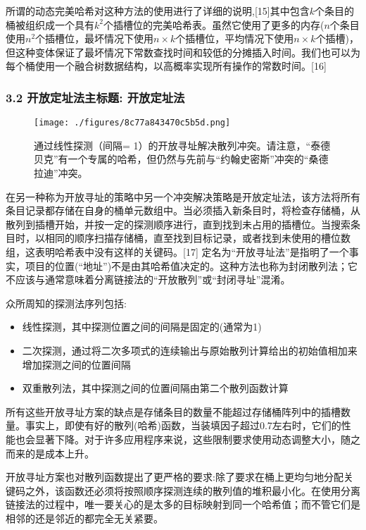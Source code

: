所谓的动态完美哈希对这种方法的使用进行了详细的说明,[15]其中包含$k$个条目的桶被组织成一个具有$k^2$个插槽位的完美哈希表。虽然它使用了更多的内存($n$个条目使用$n^2$个插槽位，最坏情况下使用$n\times k$个插槽位，平均情况下使用$n\times k$个插槽)，但这种变体保证了最坏情况下常数查找时间和较低的分摊插入时间。我们也可以为每个桶使用一个融合树数据结构，以高概率实现所有操作的常数时间。[16]

\subsubsection{3.2 开放定址法主标题: 开放定址法}
\begin{figure}[ht]
\centering
\texttt{[image: ./figures/8c77a843470c5b5d.png]}
\caption{通过线性探测（间隔= 1）的开放寻址解决散列冲突。请注意，“泰德贝克”有一个专属的哈希，但仍然与先前与“约翰史密斯”冲突的“桑德拉迪”冲突。} \label{fig_HXB_3}
\end{figure}
在另一种称为开放寻址的策略中另一个冲突解决策略是开放定址法，该方法将所有条目记录都存储在自身的桶单元数组中。当必须插入新条目时，将检查存储桶，从散列到插槽开始，并按一定的探测顺序进行，直到找到未占用的插槽位。当搜索条目时，以相同的顺序扫描存储桶，直至找到目标记录，或者找到未使用的槽位数组，这表明哈希表中没有这样的关键码。[17] 定名为“开放寻址法”是指明了一个事实，项目的位置(“地址”)不是由其哈希值决定的。这种方法也称为封闭散列法；它不应该与通常意味着分离链接法的“开放散列”或“封闭寻址”混淆。

众所周知的探测法序列包括:
\begin{itemize}
\item 线性探测，其中探测位置之间的间隔是固定的(通常为1)
\item 二次探测，通过将二次多项式的连续输出与原始散列计算给出的初始值相加来增加探测之间的位置间隔
\item 双重散列法，其中探测之间的位置间隔由第二个散列函数计算
\end{itemize}
所有这些开放寻址方案的缺点是存储条目的数量不能超过存储桶阵列中的插槽数量。事实上，即使有好的散列(哈希)函数，当装填因子超过0.7左右时，它们的性能也会显著下降。对于许多应用程序来说，这些限制要求使用动态调整大小，随之而来的是成本上升。

开放寻址方案也对散列函数提出了更严格的要求:除了要求在桶上更均匀地分配关键码之外，该函数还必须将按照顺序探测连续的散列值的堆积最小化。在使用分离链接法的过程中，唯一要关心的是太多的目标映射到同一个哈希值；而不管它们是相邻的还是邻近的都完全无关紧要。

